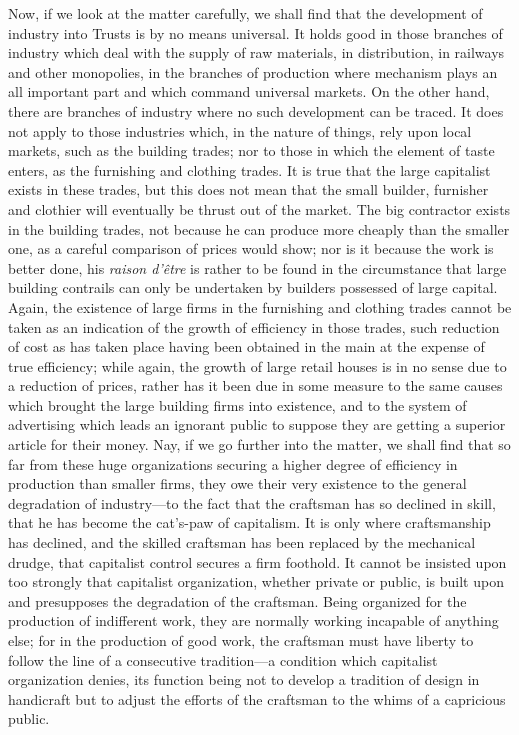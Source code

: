 \documentclass{book}
\begin{document}
Now, if we look at the matter carefully, we shall find that the development of industry into Trusts is by no means universal. It holds good in those branches of industry which deal with the supply of raw materials, in distribution, in railways and other monopolies, in the branches of production where mechanism plays an all important part and which command universal markets. On the other hand, there are branches of industry where no such development can be traced. It does not apply to those industries which, in the nature of things, rely upon local markets, such as the building trades; nor to those in which the element of taste enters, as the furnishing and clothing trades. It is true that the large capitalist exists in these trades, but this does not mean that the small builder, furnisher and clothier will eventually be thrust out of the market. The big contractor exists in the building trades, not because he can produce more cheaply than the smaller one, as a careful comparison of prices would show; nor is it because the work is better done, his \emph{raison d’être} is rather to be found in the circumstance that large building contrails can only be undertaken by builders possessed of large capital. Again, the existence of large firms in the furnishing and clothing trades cannot be taken as an indication of the growth of efficiency in those trades, such reduction of cost as has taken place having been obtained in the main at the expense of true efficiency; while again, the growth of large retail houses is in no sense due to a reduction of prices, rather has it been due in some measure to the same causes which brought the large building firms into existence, and to the system of advertising which leads an ignorant public to suppose they are getting a superior article for their money. Nay, if we go further into the matter, we shall find that so far from these huge organizations securing a higher degree of efficiency in production than smaller firms, they owe their very existence to the general degradation of industry—to the fact that the craftsman has so declined in skill, that he has become the cat’s-paw of capitalism. It is only where craftsmanship has declined, and the skilled craftsman has been replaced by the mechanical drudge, that capitalist control secures a firm foothold. It cannot be insisted upon too strongly that capitalist organization, whether private or public, is built upon and presupposes the degradation of the craftsman. Being organized for the production of indifferent work, they are normally working incapable of anything else; for in the production of good work, the craftsman must have liberty to follow the line of a consecutive tradition—a condition which capitalist organization denies, its function being not to develop a tradition of design in handicraft but to adjust the efforts of the craftsman to the whims of a capricious public.
\end{document}
